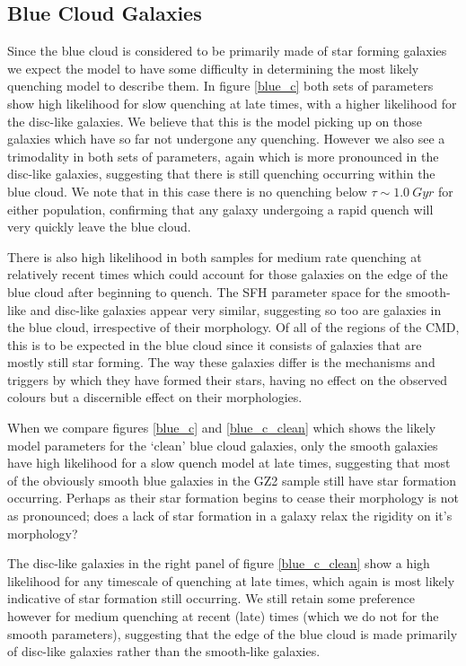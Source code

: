 \documentclass{mn2e}
\begin{document}
\subsection{Blue Cloud Galaxies}



Since the blue cloud is considered to be primarily made of star forming galaxies we expect the model to have some difficulty in determining the most likely quenching model to describe them. In figure \ref{blue_c} both sets of parameters show high likelihood for slow quenching at late times, with a higher likelihood for the disc-like galaxies. We believe that this is the model picking up on those galaxies which have so far not undergone any quenching. However we also see a trimodality in both sets of parameters, again which is more pronounced in the disc-like galaxies, suggesting that there is still quenching occurring within the blue cloud. We note that in this case there is no quenching below $\tau \sim 1.0~Gyr$ for either population, confirming that any galaxy undergoing a rapid quench will very quickly leave the blue cloud. 

There is also high likelihood in both samples for medium rate quenching at relatively recent times which could account for those galaxies on the edge of the blue cloud after beginning to quench. The SFH parameter space for the smooth-like and disc-like galaxies appear very similar, suggesting so too are galaxies in the blue cloud, irrespective of their morphology. Of all of the regions of the CMD, this is to be expected in the blue cloud since it consists of galaxies that are mostly still star forming. The way these galaxies differ is the mechanisms and triggers by which they have formed their stars, having no effect on the observed colours but a discernible effect on their morphologies.

When we compare figures \ref{blue_c} and \ref{blue_c_clean} which shows the likely model parameters for the `clean' blue cloud galaxies, only the smooth galaxies have high likelihood for a slow quench model at late times, suggesting that most of the obviously smooth blue galaxies in the GZ2 sample still have star formation occurring. Perhaps as their star formation begins to cease their morphology is not as pronounced; does a lack of star formation in a galaxy relax the rigidity on it's morphology?

The disc-like galaxies in the right panel of figure \ref{blue_c_clean} show a high likelihood for any timescale of quenching at late times, which again is most likely indicative of star formation still occurring. We still retain some preference however for medium quenching at recent (late) times (which we do not for the smooth parameters), suggesting that the edge of the blue cloud is made primarily of disc-like galaxies rather than the smooth-like galaxies. 
\end{document}
